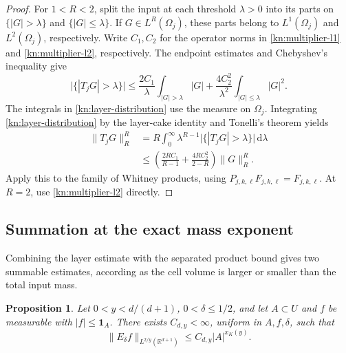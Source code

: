 \documentclass[11pt]{article}
\numberwithin{equation}{section}
\newtheorem{proposition}[theorem]{Proposition}
\newcommand{\R}{\mathbb{R}}
\newcommand{\dd}{\,\mathrm{d}}
\newcommand{\norm}[1]{\lVert #1\rVert}
\begin{document}
\begin{proof}
For \(1<R<2\), split the input at each threshold \(\lambda>0\) into
its parts on \(\{|G|>\lambda\}\) and \(\{|G|\le\lambda\}\). If
\(G\in L^R(\Omega_j)\), these parts belong to \(L^1(\Omega_j)\)
and \(L^2(\Omega_j)\), respectively.
Write \(C_1,C_2\) for the operator norms in
\eqref{kn:multiplier-l1} and \eqref{kn:multiplier-l2}, respectively.
The endpoint estimates and Chebyshev's inequality give
\begin{equation}\label{kn:layer-distribution}
 \big|\{|T_jG|>\lambda\}\big|
 \le \frac{2C_1}{\lambda}\int_{|G|>\lambda}|G|
     +\frac{4C_2^2}{\lambda^2}\int_{|G|\le\lambda}|G|^2.
\end{equation}
The integrals in \eqref{kn:layer-distribution} use the measure on
\(\Omega_j\). Integrating \eqref{kn:layer-distribution} by the
layer-cake identity and Tonelli's theorem yields
\[
 \begin{aligned}
 \norm{T_jG}_R^R
 &=R\int_0^\infty\lambda^{R-1}
       \bigl|\{|T_jG|>\lambda\}\bigr|\dd\lambda\\
 &\le
 \left(\frac{2RC_1}{R-1}+\frac{4RC_2^2}{2-R}\right)\norm{G}_R^R.
 \end{aligned}
\]
Apply this to the family of Whitney products, using
\(P_{j,k,\ell}F_{j,k,\ell}=F_{j,k,\ell}\). At \(R=2\), use
\eqref{kn:multiplier-l2} directly.
\end{proof}

\subsection{Summation at the exact mass exponent}

Combining the layer estimate with the separated product bound gives
two summable estimates, according as the cell volume is larger or
smaller than the total input mass.

\begin{proposition}\label{kn:restricted}
Let \(0<y<d/(d+1)\), \(0<\delta\le1/2\), and let
\(A\subset U\) and \(f\) be measurable with \(|f|\le\mathbf1_A\).
There exists \(C_{d,y}<\infty\), uniform in \(A,f,\delta\), such that
\[
 \norm{E_\delta f}_{L^{2/y}(\R^{d+1})}
       \le C_{d,y}|A|^{x_K(y)}.
\]
\end{proposition}
\end{document}
